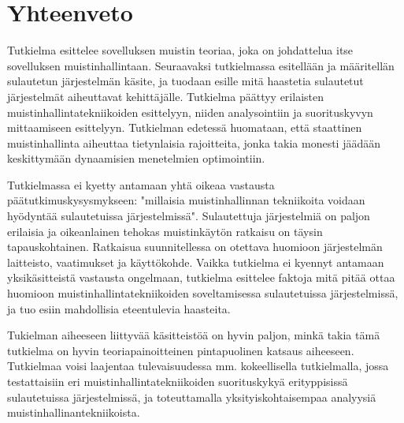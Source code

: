 \chapter{Yhteenveto} \label{Yhteenveto}

Tutkielma esittelee sovelluksen muistin teoriaa, joka on johdattelua itse sovelluksen muistinhallintaan. Seuraavaksi tutkielmassa esitellään ja määritellän sulautetun järjestelmän käsite, ja tuodaan esille mitä haastetia sulautetut järjestelmät aiheuttavat kehittäjälle. Tutkielma päättyy erilaisten muistinhallintatekniikoiden esittelyyn, niiden analysointiin ja suorituskyvyn mittaamiseen esittelyyn. Tutkielman edetessä huomataan, että staattinen muistinhallinta aiheuttaa tietynlaisia rajoitteita, jonka takia monesti jäädään keskittymään dynaamisien menetelmien optimointiin.

Tutkielmassa ei kyetty antamaan yhtä oikeaa vastausta päätutkimuskysysmykseen: "millaisia muistinhallinnan tekniikoita voidaan hyödyntää sulautetuissa järjestelmissä". Sulautettuja järjestelmiä on paljon erilaisia ja oikeanlainen tehokas muistinkäytön ratkaisu on täysin tapauskohtainen. Ratkaisua suunnitellessa on otettava huomioon järjestelmän laitteisto, vaatimukset ja käyttökohde. Vaikka tutkielma ei kyennyt antamaan yksikäsitteistä vastausta ongelmaan, tutkielma esittelee faktoja mitä pitää ottaa huomioon muistinhallintatekniikoiden soveltamisessa sulautetuissa järjestelmissä, ja tuo esiin mahdollisia eteentulevia haasteita.

Tukielman aiheeseen liittyvää käsitteistöä on hyvin paljon, minkä takia tämä tutkielma on hyvin teoriapainoitteinen pintapuolinen katsaus aiheeseen. Tutkielmaa voisi laajentaa tulevaisuudessa mm. kokeellisella tutkielmalla, jossa testattaisiin eri muistinhallintatekniikoiden suorituskykyä erityppisissä sulautetuissa järjestelmissä, ja toteuttamalla yksityiskohtaisempaa analyysiä muistinhallinantekniikoista.